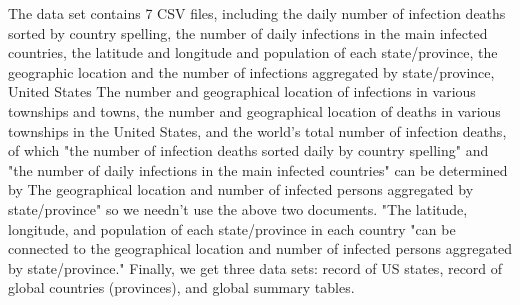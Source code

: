 \documentclass[a4paper, 11pt,twoside=true]{scrartcl}
\begin{document}
\quad The data set contains 7 CSV files, including the daily number of infection deaths sorted by country spelling, the number of daily infections in the main infected countries, the latitude and longitude and population of each state/province, the geographic location and the number of infections aggregated by state/province, United States The number and geographical location of infections in various townships and towns, the number and geographical location of deaths in various townships in the United States, and the world’s total number of infection deaths, of which "the number of infection deaths sorted daily by country spelling" and "the number of daily infections in the main infected countries" can be determined by The geographical location and number of infected persons aggregated by state/province" so we needn't use the above two documents. "The latitude, longitude, and population of each state/province in each country "can be connected to the geographical location and number of infected persons aggregated by state/province." Finally, we get three data sets: record of US states, record of global countries (provinces), and global summary tables.\\
\end{document}
